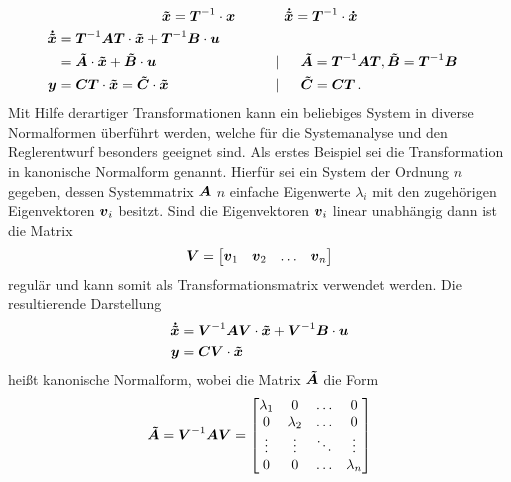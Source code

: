 \begin{equation}
\boldsymbol{\tilde{x}} = \boldsymbol{T}^{-1}\cdot\boldsymbol{x} \hspace{35pt}\boldsymbol{\dot{\tilde{x}}} = \boldsymbol{T}^{-1}\cdot \boldsymbol{\dot{x}}
\end{equation}
\begin{align}
\boldsymbol{\dot{\tilde{x}}} &= \boldsymbol{T}^{-1}\boldsymbol{A}\boldsymbol{T}\cdot \boldsymbol{\tilde{x}} + \boldsymbol{T}^{-1}\boldsymbol{B}\cdot \boldsymbol{u} \nonumber \\
& = \boldsymbol{\tilde{A}}\cdot \boldsymbol{\tilde{x}} + \boldsymbol{\tilde{B}}\cdot \boldsymbol{u} &&\hspace{30pt} \vert \hspace{15pt} \boldsymbol{\tilde{A}} = \boldsymbol{T}^{-1}\boldsymbol{A}\boldsymbol{T}, \boldsymbol{\tilde{B}} = \boldsymbol{T}^{-1}\boldsymbol{B}
\\
\boldsymbol{y} &= \boldsymbol{C}\boldsymbol{T}\cdot \boldsymbol{\tilde{x}} 
= \boldsymbol{\tilde{C}}\cdot \boldsymbol{\tilde{x}} &&\hspace{30pt} \vert \hspace{15pt} \boldsymbol{\tilde{C}} = \boldsymbol{C}\boldsymbol{T}\,.
\end{align}
Mit Hilfe derartiger Transformationen kann ein beliebiges System in diverse Normalformen überführt werden, welche für die Systemanalyse und den Reglerentwurf besonders geeignet sind. Als erstes Beispiel sei die Transformation in kanonische Normalform genannt. Hierfür sei ein System  der Ordnung $n$ gegeben, dessen Systemmatrix $\boldsymbol{A}$ $n$ einfache Eigenwerte $\lambda_i$ mit den zugehörigen Eigenvektoren $\boldsymbol{v}_i$ besitzt. Sind die Eigenvektoren $\boldsymbol{v}_i$ linear unabhängig dann ist die Matrix
\begin{equation}
\boldsymbol{V} = \begin{bmatrix}
\boldsymbol{v}_{\text{1}} & \boldsymbol{v}_{\text{2}} & \hdots & \boldsymbol{v}_n 
\end{bmatrix}
\end{equation}
regulär und kann somit als Transformationsmatrix verwendet werden. Die resultierende Darstellung
\begin{equation}
\begin{split}
\boldsymbol{\dot{\tilde{x}}} &= \boldsymbol{V}^{-1}\boldsymbol{A}\boldsymbol{V}\cdot \boldsymbol{\tilde{x}} + \boldsymbol{V}^{-1}\boldsymbol{B}\cdot \boldsymbol{u} \\
\boldsymbol{y} &= \boldsymbol{C}\boldsymbol{V}\cdot \boldsymbol{\tilde{x}}
\end{split}
\end{equation}
heißt kanonische Normalform, wobei die Matrix $\boldsymbol{\tilde{A}}$ die Form
\begin{equation}
\boldsymbol{\tilde{A}} = \boldsymbol{V}^{-1}\boldsymbol{A}\boldsymbol{V} = \begin{bmatrix}
\lambda_{\text{1}} & 0 & \hdots & 0 \\
0 & \lambda_{\text{2}} & \hdots & 0 \\
\vdots & \vdots & \ddots & \vdots \\
0 & 0 & \hdots & \lambda_n
\end{bmatrix}
\end{equation}
